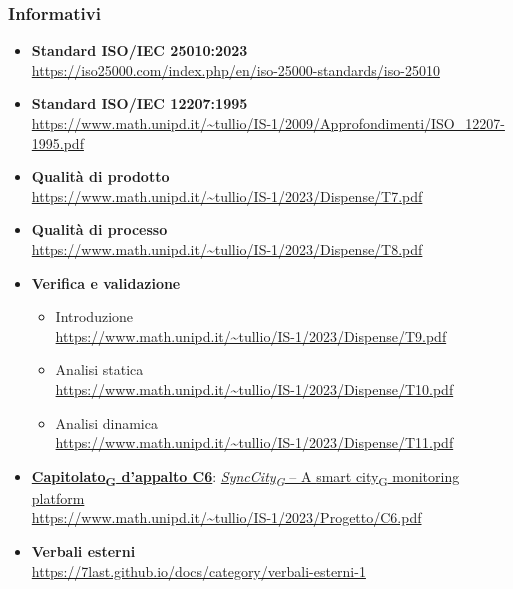 \subsubsection{Informativi}
\begin{itemize}
    \item \textbf{Standard ISO/IEC 25010:2023} \\
        \url{https://iso25000.com/index.php/en/iso-25000-standards/iso-25010}
    \item \textbf{Standard ISO/IEC 12207:1995} \\
        \url{https://www.math.unipd.it/~tullio/IS-1/2009/Approfondimenti/ISO_12207-1995.pdf}
    \item \textbf{Qualità di prodotto} \\
        \url{https://www.math.unipd.it/~tullio/IS-1/2023/Dispense/T7.pdf}
    \item \textbf{Qualità di processo} \\
        \url{https://www.math.unipd.it/~tullio/IS-1/2023/Dispense/T8.pdf}
    \item \textbf{Verifica e validazione}
        \begin{itemize}
            \item Introduzione \\
                \url{https://www.math.unipd.it/~tullio/IS-1/2023/Dispense/T9.pdf}
            \item Analisi statica \\
                \url{https://www.math.unipd.it/~tullio/IS-1/2023/Dispense/T10.pdf}
            \item Analisi dinamica \\
                \url{https://www.math.unipd.it/~tullio/IS-1/2023/Dispense/T11.pdf}
        \end{itemize}
	\item \href{https://7last.github.io/docs/rtb/documentazione-interna/glossario\#capitolato}{\textbf{Capitolato\textsubscript{G} d'appalto C6}}: \href{https://7last.github.io/docs/rtb/documentazione-interna/glossario\#synccity}{\textit{SyncCity\textsubscript{G} } – A \href{https://7last.github.io/docs/rtb/documentazione-interna/glossario\#smart-city}{smart city\textsubscript{G}} monitoring platform}\\
    \url{https://www.math.unipd.it/~tullio/IS-1/2023/Progetto/C6.pdf}
    \item \textbf{Verbali esterni} \\
        \url{https://7last.github.io/docs/category/verbali-esterni-1}

\end{itemize}
